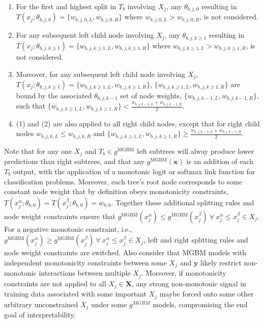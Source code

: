 \documentclass[information,article,submit,moreauthors,pdftex]{definitions/mdpi}
\begin{document}
\begin{enumerate}[leftmargin=*,labelsep=4.9mm]
\item For the first and highest split in $T_b$ involving $X_j$, any $\theta_{b,j,0}$ resulting in $T(x_j; \theta_{b,j,0}) = \{w_{b,j,0,L}, w_{b,j,0,R}\}$ where $w_{b,j,0,L} > w_{b,j,0,R}$, is not considered. 
\item For any subsequent left child node involving $X_j$, any $\theta_{b,j, k\ge1}$ resulting in $T(x_j; \theta_{b,j,k\ge1}) = \{w_{b,j,k\ge1,L}, w_{b,j,k\ge1,R}\}$ where $w_{b,j,k\ge1,L} > w_{b,j,k\ge1,R}$, is not considered.
\item Moreover, for any subsequent left child node involving $X_j$, $T(x_j; \theta_{b,j,k\ge1}) = \{w_{b,j,k\ge1,L}, w_{b,j,k\ge1,R}\}$, $\{w_{b,j,k\ge1,L}, w_{b,j,k\ge1,R}\}$ are bound by the associated $\theta_{b,j,k-1}$ set of node weights, $\{w_{b,j,k-1,L}, w_{b,j,k-1, R}\}$, such that $ \{w_{b,j,k\ge1,L}, w_{b,j,k\ge1,R}\} < \frac{w_{b,j,k-1,L} + w_{b,j,k-1,R}}{2}$.
\item (1) and (2) are also applied to all right child nodes, except that for right child nodes $ w_{b,j,k,L} \le w_{b,j,k,R}$ and $\{w_{b,j,k\ge1,L}, w_{b,j,k\ge1,R}\} \ge \frac{w_{b,j,k-1,L} + w_{b,j,k-1,R}}{2}$.
\end{enumerate}

\noindent Note that for any one $X_j$ and $T_b \in g^{\text{MGBM}}$ left subtrees will alway produce lower predictions than right subtrees, and that any $g^{\text{MGBM}}(\mathbf{x})$ is an addition of each $T_b$ output, with the application of a monotonic logit or softmax link function for classification problems. Moreover, each tree's root node corresponds to some constant node weight that by definition obeys monotonicity constraints, $ T(x^{\alpha}_j; \theta_{b,0}) = T(x^{\beta}_j; \theta_{b,0}) = w_{b,0}$. Together these additional splitting rules and node weight constraints ensure that $g^{\text{MGBM}}(x^{\alpha}_j)  \le g^{\text{MGBM}}(x^{\beta}_j) ~\forall ~x^{\alpha}_j \le x^{\beta}_j \in X_j$. For a negative monotonic constraint, i.e., $g^{\text{MGBM}}(x^{\alpha}_j)  \ge g^{\text{MGBM}}(x^{\beta}_j) ~\forall ~x^{\alpha}_j \le x^{\beta}_j \in X_j$, left and right splitting rules and node weight constraints are switched. Also consider that MGBM models with independent monotonicity constraints between some $X_j$ and $\mathbf{y}$ likely restrict non-monotonic interactions between multiple $X_j$. Moreover, if monotonicity constraints are not applied to all $X_j \in \mathbf{X}$, any strong non-monotonic signal in training data associated with some important $X_j$ maybe forced onto some other arbitrary unconstrained $X_j$ under some $g^{MGBM}$ models, compromising the end goal of interpretability.
\end{document}

